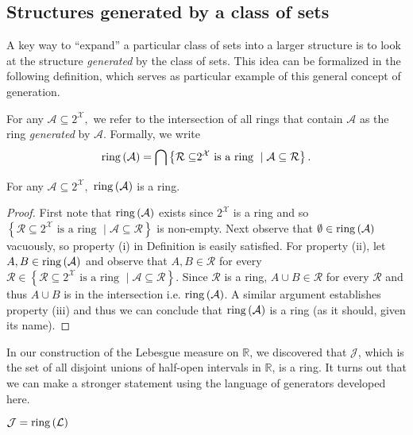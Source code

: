 \subsection{Structures generated by a class of sets}

A key way to ``expand'' a particular class of sets into a larger
structure is to look at the structure \emph{generated }by the class
of sets. This idea can be formalized in the following definition,
which serves as particular example of this general concept of generation.
\begin{defn}
\label{def:ringGeneratedByClass}For any $\mathcal{A}\subseteq2^{\mathcal{X}},$
we refer to the intersection of all rings that contain $\mathcal{A}$
as the ring \emph{generated }by $\mathcal{A}$. Formally, we write
\[
\mathrm{ring}\left(\mathcal{A}\right)=\bigcap\left\{ \mathcal{R\subseteq}2^{\mathcal{X}}\text{ is a ring }\mid\mathcal{A\subseteq\mathcal{R}}\right\} .
\]
\end{defn}

\begin{prop}
\label{prop:ringGeneratedByClassIsRing}For any $\mathcal{A}\subseteq2^{\mathcal{X}},$
$\mathrm{ring}\left(\mathcal{A}\right)$ is a ring.
\end{prop}

\begin{proof}
First note that $\mathrm{ring}\left(\mathcal{A}\right)$ exists since $2^{\mathcal{X}}$
is a ring and so $\left\{ \mathcal{R\subseteq}2^{\mathcal{X}}\text{ is a ring }\mid\mathcal{A\subseteq\mathcal{R}}\right\} $
is non-empty. Next observe that $\emptyset\in\mathrm{ring}\left(\mathcal{A}\right)$
vacuously, so property (i) in Definition  is easily
satisfied. For property (ii), let $A,B\in\mathrm{ring}\left(\mathcal{A}\right)$
and observe that $A,B\in\mathcal{R}$ for every $\mathcal{R}\in\left\{ \mathcal{R\subseteq}2^{\mathcal{X}}\text{ is a ring }\mid\mathcal{A\subseteq\mathcal{R}}\right\} $.
Since $\mathcal{R}$ is a ring, $A\cup B\in\mathcal{R}$ for every
$\mathcal{R}$ and thus $A\cup B$ is in the intersection i.e. $\mathrm{ring}\left(\mathcal{A}\right)$.
A similar argument establishes property (iii) and thus we can conclude
that $\mathrm{ring}\left(\mathcal{A}\right)$ is a ring (as it should, given
its name).
\end{proof}
In our construction of the Lebesgue measure on $\mathds{R}$, we discovered
that $\mathcal{J}$, which is the set of all disjoint unions of half-open
intervals in $\mathds{R}$, is a ring. It turns out that we can make
a stronger statement using the language of generators developed here.
\begin{prop}
\label{prop:JisRingGeneratedByL}$\mathcal{J}=\mathrm{ring}\left(\mathcal{L}\right)$
\end{prop}

